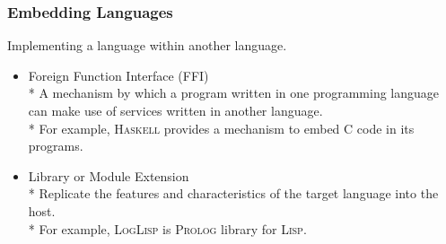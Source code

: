 \documentclass[hideothersubsections, t, aspectratio=1610]{beamer}
\newcommand{\progLang}[1]{\textsc{#1}}
\begin{document}
\begin{frame}
\frametitle{Embedding Languages}

Implementing a language within another language.

\begin{itemize}
\item Foreign Function Interface (FFI)
 \\* A mechanism by which a program written in one programming language can make use of services written in another language. 
\\* For example, \progLang{Haskell} provides a mechanism to embed \progLang{C} code in its programs.

\item Library or Module Extension
\\* Replicate the features and characteristics of the target language into the host. 
\\* For example, \progLang{LogLisp} is \progLang{Prolog} library for \progLang{Lisp}. 
\end{itemize}

\end{frame}
\end{document}
